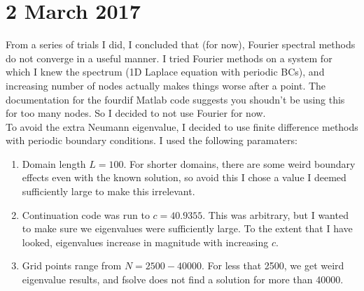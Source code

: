 \documentclass[12pt]{article}
\begin{document}
\section*{2 March 2017}
From a series of trials I did, I concluded that (for now), Fourier spectral methods do not converge in a useful manner. I tried Fourier methods on a system for which I knew the spectrum (1D Laplace equation with periodic BCs), and increasing number of nodes actually makes things worse after a point. The documentation for the \textrm{fourdif} Matlab code suggests you shoudn't be using this for too many nodes. So I decided to not use Fourier for now.\\

To avoid the extra Neumann eigenvalue, I decided to use finite difference methods with periodic boundary conditions. I used the following paramaters:
\begin{enumerate}
	\item Domain length $L = 100$. For shorter domains, there are some weird boundary effects even with the known solution, so avoid this I chose a value I deemed sufficiently large to make this irrelevant.
	\item Continuation code was run to $c = 40.9355$. This was arbitrary, but I wanted to make sure we eigenvalues were sufficiently large. To the extent that I have looked, eigenvalues increase in magnitude with increasing $c$.
	\item Grid points range from $N = 2500 - 40000$. For less that 2500, we get weird eigenvalue results, and fsolve does not find a solution for more than 40000.
\end{enumerate}
\end{document}
